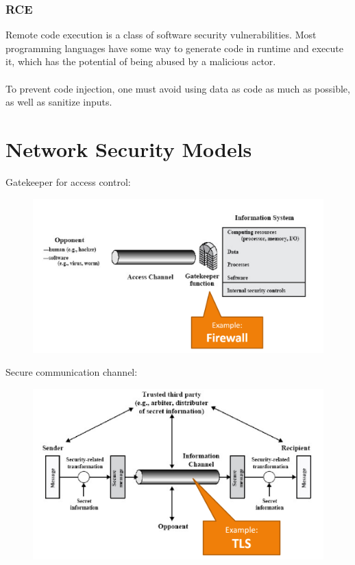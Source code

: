 \documentclass[10pt,a4paper]{report}
\begin{document}
\subsubsection{RCE}
Remote code execution is a  class of software security vulnerabilities. Most programming languages have some way to generate code in runtime and execute it, which has the potential of being abused by a malicious actor.\\
\\
To prevent code injection, one must avoid using data as code as much as possible, as well as sanitize inputs.
\section{Network Security Models}
Gatekeeper for access control:
\begin{figure}[H]
\centering
\includegraphics[scale=0.45]{14.png}
\end{figure}
Secure communication channel:
\begin{figure}[H]
\centering
\includegraphics[scale=0.45]{15.png}
\end{figure}
\end{document}
